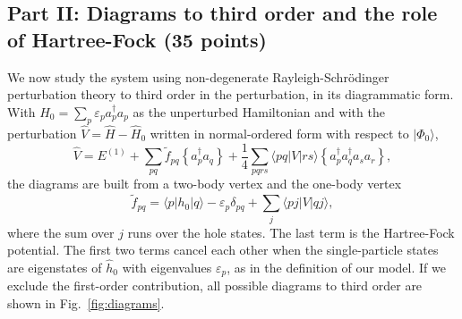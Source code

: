 \documentclass[prc]{revtex4}
\newcommand{\normord}[1]{ \left\{#1\right\} }
\begin{document}
\subsection*{Part II: Diagrams to third order and the role of Hartree-Fock (35 points)}

We now study the system using non-degenerate Rayleigh-Schr\"odinger
perturbation theory to third order in the perturbation, in its
diagrammatic form. With
$\hat{H}_0=\sum_p\varepsilon_pa^\dagger_pa_p$ as the unperturbed
Hamiltonian and with the perturbation $\hat{V}=\hat{H}-\hat{H}_0$
written in normal-ordered form with respect to $|\Phi_0\rangle$,
\[
\hat{V}=E^{(1)}+\sum_{pq}\tilde{f}_{pq}\normord{a^\dagger_pa_q}
+\frac{1}{4}\sum_{pqrs}\langle pq|V|rs\rangle
\normord{a^\dagger_pa^\dagger_qa_sa_r},
\]
the diagrams are built from a two-body vertex and the one-body vertex
\begin{equation}
\tilde{f}_{pq}=\langle p|h_0|q\rangle-\varepsilon_p\delta_{pq}
+\sum_{j}\langle pj|V|qj\rangle ,
\label{eq:onebodyvertex}
\end{equation}
where the sum over $j$ runs over the hole states. The last term is the
Hartree-Fock potential. The first two terms cancel each other when
the single-particle states are eigenstates of $\hat{h}_0$ with
eigenvalues $\varepsilon_p$, as in the definition of our model. If we
exclude the first-order contribution, all possible diagrams to third
order are shown in Fig.~\ref{fig:diagrams}.
\end{document}
